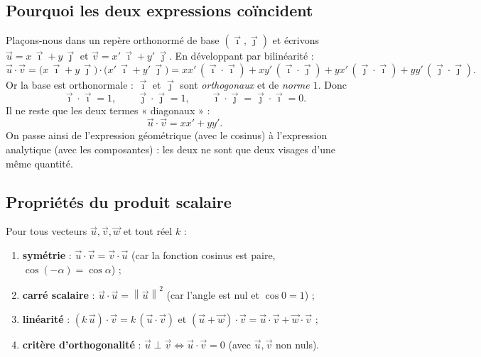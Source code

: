 \documentclass[11pt,a4paper]{article}
\providecommand{\norm}[1]{\left\lVert #1\right\rVert}
\begin{document}
\subsection{Pourquoi les deux expressions coïncident}

Plaçons-nous dans un repère orthonormé de base $(\vec{\imath},\vec{\jmath})$ et écrivons
$\vec{u}=x\,\vec{\imath}+y\,\vec{\jmath}$ et $\vec{v}=x'\,\vec{\imath}+y'\,\vec{\jmath}$. En développant
par bilinéarité :
\[
  \vec{u}\cdot\vec{v}=\bigl(x\,\vec{\imath}+y\,\vec{\jmath}\bigr)\cdot\bigl(x'\,\vec{\imath}+y'\,\vec{\jmath}\bigr)
  =x x'\,(\vec{\imath}\cdot\vec{\imath})+x y'\,(\vec{\imath}\cdot\vec{\jmath})
  +y x'\,(\vec{\jmath}\cdot\vec{\imath})+y y'\,(\vec{\jmath}\cdot\vec{\jmath}).
\]
Or la base est orthonormale : $\vec{\imath}$ et $\vec{\jmath}$ sont \emph{orthogonaux} et de
\emph{norme $1$}. Donc
\[
  \vec{\imath}\cdot\vec{\imath}=1,\qquad \vec{\jmath}\cdot\vec{\jmath}=1,\qquad
  \vec{\imath}\cdot\vec{\jmath}=\vec{\jmath}\cdot\vec{\imath}=0.
\]
Il ne reste que les deux termes « diagonaux » :
\[
  \boxed{\;\vec{u}\cdot\vec{v}=x x'+y y'.\;}
\]
On passe ainsi de l'expression géométrique (avec le cosinus) à l'expression analytique (avec les
composantes) : les deux ne sont que deux visages d'une même quantité.

\subsection{Propriétés du produit scalaire}

\begin{theoreme}
Pour tous vecteurs $\vec{u},\vec{v},\vec{w}$ et tout réel $k$ :
\begin{enumerate}[leftmargin=1.8em,topsep=2pt,itemsep=2pt,label=(\alph*)]
  \item \textbf{symétrie} : $\vec{u}\cdot\vec{v}=\vec{v}\cdot\vec{u}$ (car la fonction cosinus est paire,
        $\cos(-\alpha)=\cos\alpha$) ;
  \item \textbf{carré scalaire} : $\vec{u}\cdot\vec{u}=\norm{\vec{u}}^2$ (car l'angle est nul et
        $\cos 0=1$) ;
  \item \textbf{linéarité} : $(k\,\vec{u})\cdot\vec{v}=k\,(\vec{u}\cdot\vec{v})$ et
        $(\vec{u}+\vec{w})\cdot\vec{v}=\vec{u}\cdot\vec{v}+\vec{w}\cdot\vec{v}$ ;
  \item \textbf{critère d'orthogonalité} : $\vec{u}\perp\vec{v}\iff\vec{u}\cdot\vec{v}=0$
        (avec $\vec{u},\vec{v}$ non nuls).
\end{enumerate}
\end{theoreme}
\end{document}
